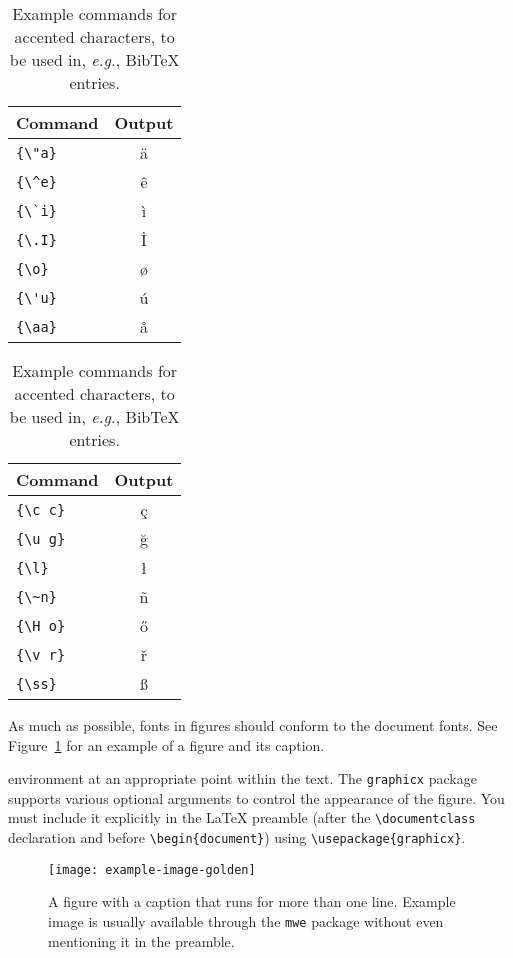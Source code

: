 \documentclass[11pt]{article}
\begin{document}
\begin{table}
  \centering
  \begin{tabular}{lc}
    \hline
    \textbf{Command} & \textbf{Output} \\
    \hline
    \verb|{\"a}|     & {\"a}           \\
    \verb|{\^e}|     & {\^e}           \\
    \verb|{\`i}|     & {\`i}           \\
    \verb|{\.I}|     & {\.I}           \\
    \verb|{\o}|      & {\o}            \\
    \verb|{\'u}|     & {\'u}           \\
    \verb|{\aa}|     & {\aa}           \\\hline
  \end{tabular}
  \begin{tabular}{lc}
    \hline
    \textbf{Command} & \textbf{Output} \\
    \hline
    \verb|{\c c}|    & {\c c}          \\
    \verb|{\u g}|    & {\u g}          \\
    \verb|{\l}|      & {\l}            \\
    \verb|{\~n}|     & {\~n}           \\
    \verb|{\H o}|    & {\H o}          \\
    \verb|{\v r}|    & {\v r}          \\
    \verb|{\ss}|     & {\ss}           \\
    \hline
  \end{tabular}
  \caption{Example commands for accented characters, to be used in, \emph{e.g.}, Bib\TeX{} entries.}
  \label{tab:accents}
\end{table}

As much as possible, fonts in figures should conform
to the document fonts. See Figure~\ref{fig:experiments} for an example of a figure and its caption.

environment at an appropriate point within the text.
The \verb|graphicx| package supports various optional arguments to control the
appearance of the figure.
You must include it explicitly in the \LaTeX{} preamble (after the
\verb|\documentclass| declaration and before \verb|\begin{document}|) using
\verb|\usepackage{graphicx}|.

\begin{figure}[t]
  \texttt{[image: example-image-golden]}
  \caption{A figure with a caption that runs for more than one line.
    Example image is usually available through the \texttt{mwe} package
    without even mentioning it in the preamble.}
  \label{fig:experiments}
\end{figure}
\end{document}
